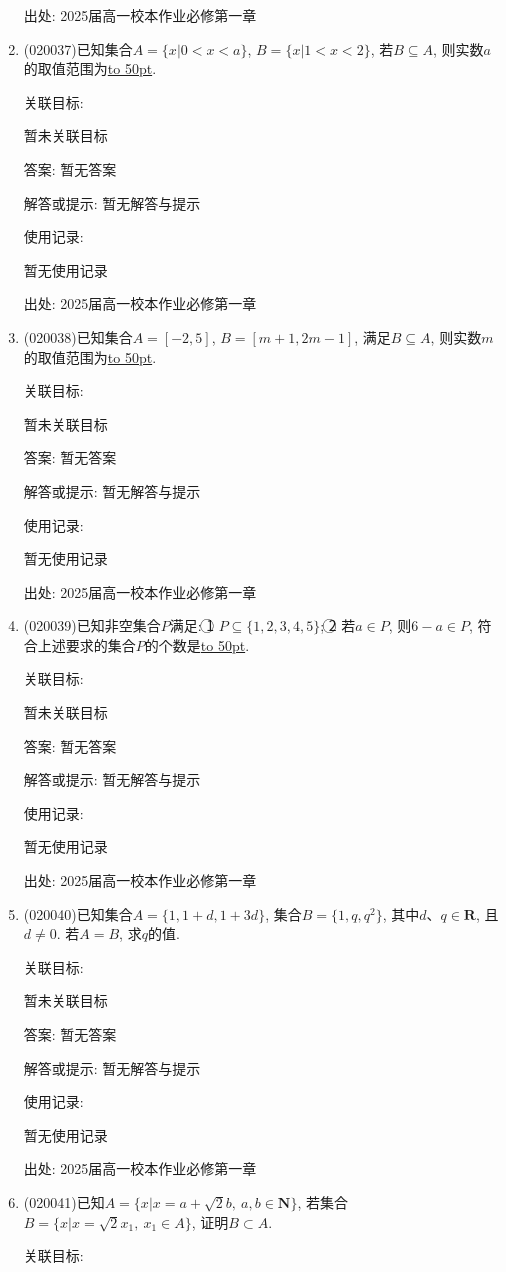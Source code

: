 \documentclass[10pt,a4paper]{article}
\newcommand{\blank}[1]{\underline{\hbox to #1pt{}}}
\begin{document}
\begin{enumerate}[1.]
出处: 2025届高一校本作业必修第一章
\item { (020037)}已知集合$A=\{x|0<x<a\}$, $B=\{x|1<x<2\}$, 若$B\subseteq A$, 则实数$a$的取值范围为\blank{50}.


关联目标:

暂未关联目标

答案: 暂无答案

解答或提示: 暂无解答与提示

使用记录:

暂无使用记录


出处: 2025届高一校本作业必修第一章
\item { (020038)}已知集合$A=[-2,5]$, $B=[m+1,2m-1]$, 满足$B\subseteq A$, 则实数$m$的取值范围为\blank{50}.


关联目标:

暂未关联目标

答案: 暂无答案

解答或提示: 暂无解答与提示

使用记录:

暂无使用记录


出处: 2025届高一校本作业必修第一章
\item { (020039)}已知非空集合$P$满足: \textcircled{1} $P\subseteq \{1,2,3,4,5\}$; \textcircled{2} 若$a\in P$, 则$6-a\in P$, 符合上述要求的集合$P$的个数是\blank{50}.


关联目标:

暂未关联目标

答案: 暂无答案

解答或提示: 暂无解答与提示

使用记录:

暂无使用记录


出处: 2025届高一校本作业必修第一章
\item { (020040)}已知集合$A=\{1, 1+d, 1+3d\}$, 集合$B=\{1, q, q^2\}$, 其中$d$、$q\in \mathbf{R}$, 且$d\ne 0$. 若$A=B$, 求$q$的值.


关联目标:

暂未关联目标

答案: 暂无答案

解答或提示: 暂无解答与提示

使用记录:

暂无使用记录


出处: 2025届高一校本作业必修第一章
\item { (020041)}已知$A=\{x|x=a+\sqrt 2b,\ a,b\in \mathbf{N}\}$, 若集合$B=\{x|x=\sqrt 2x_1,\  x_1 \in A\}$, 证明$B\subset A$.


关联目标:


\end{enumerate}
\end{document}

